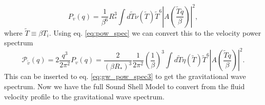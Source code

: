 \cite[eq. 4.17]{hindmarsh_gw_pt_2019}
\begin{equation}
P_v(q) = \frac{1}{\beta^6}{R_*^3} \int d\tilde{T} \nu(\tilde{T}) \tilde{T}^6 |A(\frac{\tilde{T}q}{\beta})|^2,
\label{eq:spec_den_v}
\end{equation}
where $\tilde{T} \equiv \beta T_i$.
Using eq. \eqref{eq:pow_spec} we can convert this to the velocity power spectrum
\cite[eq. 4.18]{hindmarsh_gw_pt_2019}
\begin{equation}
\mathcal{P}_{\tilde{v}}(q)
= 2 \frac{q^3}{2\pi^2} P_v(q)
= \frac{2}{(\beta R_*)^3} \frac{1}{2\pi^2} \left(\frac{1}{\beta}\right)^3
\int d \tilde{T} \eta(\tilde{T}) \tilde{T}^6 \left| A \left( \frac{\tilde{T} q}{\beta} \right) \right|^2.
\label{eq:pow_v}
\end{equation}
This can be inserted to eq. \ref{eq:gw_pow_spec3} to get the gravitational wave spectrum.
Now we have the full Sound Shell Model to convert from the fluid velocity profile to the gravitational wave spectrum.

